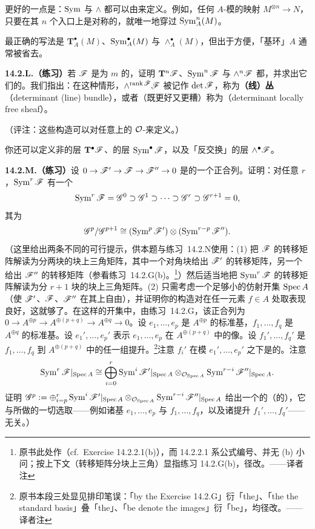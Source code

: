 更好的一点是：$\operatorname{Sym}$ 与 $\wedge$ 都可以由\trUniversalProperty{}来定义。例如，任何 $A$-模的映射 $M^{\otimes n}\to N$，只要在其 $n$ 个入口上是对称的，就唯一地穿过 $\operatorname{Sym}^n_A(M)$。

最正确的写法是 $\mathbf{T}^\bullet_A(M)$、$\operatorname{Sym}^\bullet_A(M)$ 与 $\wedge^\bullet_A(M)$，但出于方便，「基环」$A$ 通常被省去。

\textbf{14.2.L.（练习）}\quad 若 $\mathscr{F}$ 是\trRank{}为 $m$ 的\trLocallyFreeSheaf，证明 $\mathbf{T}^n\mathscr{F}$、$\operatorname{Sym}^n\mathscr{F}$ 与 $\wedge^n\mathscr{F}$ 都\trLocallyFree，并求出它们的\trRank。我们指出：在这种情形，$\wedge^{\operatorname{rank}\mathscr{F}}\mathscr{F}$ 被记作 $\det\mathscr{F}$，称为\textbf{\trDeterminant{}（线）丛}（determinant (line) bundle），或者（既更好又更糟）称为\textbf{\trDeterminant{}\trLocallyFreeSheaf}（determinant locally free sheaf）。

（评注：这些构造可以对任意\trRingedSpace{}上的 $\mathcal{O}$-\trModule{}来定义。）

你还可以定义非\trCommutative{}\trAlgebra{}的层 $\mathbf{T}^\bullet\mathscr{F}$、\trCommutative{}\trAlgebra{}的层 $\operatorname{Sym}^\bullet\mathscr{F}$，以及「反交换」\trAlgebra{}的层 $\wedge^\bullet\mathscr{F}$。

\textbf{14.2.M.（练习）}\quad 设 $0\to\mathscr{F}'\to\mathscr{F}\to\mathscr{F}''\to 0$ 是\trLocallyFreeSheaf{}的一个正合列。证明：对任意 $r$，$\operatorname{Sym}^r\mathscr{F}$ 有一个\trFiltration
\[
\operatorname{Sym}^r\mathscr{F}=\mathscr{G}^0\supset\mathscr{G}^1\supset\cdots\supset\mathscr{G}^r\supset\mathscr{G}^{r+1}=0,
\]
其\trSubquotient{}为
\[
\mathscr{G}^p/\mathscr{G}^{p+1}\cong(\operatorname{Sym}^p\mathscr{F}')\otimes(\operatorname{Sym}^{r-p}\mathscr{F}'').
\]
（这里给出两条不同的可行提示，供本题与\mbox{练习~14.2.N}使用：(1) 把 $\mathscr{F}$ 的转移矩阵解读为分两块的块上三角矩阵，其中一个对角块给出 $\mathscr{F}'$ 的转移矩阵，另一个给出 $\mathscr{F}''$ 的转移矩阵（参看\mbox{练习~14.2.G(b)}。\footnote{原书此处作（cf.\ Exercise 14.2.2.1(b)），而 14.2.2.1 系公式编号、并无 (b) 小问；按上下文（转移矩阵分块上三角）显指练习 14.2.G(b)，径改。——译者注}）然后适当地把 $\operatorname{Sym}^r\mathscr{F}$ 的转移矩阵解读为分 $r+1$ 块的块上三角矩阵。(2) 只需考虑一个足够小的仿射开集 $\operatorname{Spec} A$（使 $\mathscr{F}'$、$\mathscr{F}$、$\mathscr{F}''$ 在其上自由），并证明你的构造对在任一元素 $f\in A$ 处取\trLocalization{}表现良好，这就够了。在这样的开集中，由\mbox{练习~14.2.G}，该正合列为 $0\to A^{\oplus p}\to A^{\oplus(p+q)}\to A^{\oplus q}\to 0$。设 $e_1,\dots,e_p$ 是 $A^{\oplus p}$ 的标准基，$f_1,\dots,f_q$ 是 $A^{\oplus q}$ 的标准基。设 $e_1',\dots,e_p'$ 表示 $e_1,\dots,e_p$ 在 $A^{\oplus(p+q)}$ 中的像。设 $f_1',\dots,f_q'$ 是 $f_1,\dots,f_q$ 到 $A^{\oplus(p+q)}$ 中的任一组提升。\footnote{原书本段三处显见排印笔误：「by the Exercise 14.2.G」衍「the」、「the the standard basis」叠「the」、「be denote the images」衍「be」，均径改。——译者注}注意 $f_i'$ 在模 $e_1',\dots,e_p'$ 之下是\trWellDefined{}的。注意
\[
\operatorname{Sym}^r\mathscr{F}|_{\operatorname{Spec} A}\cong\bigoplus_{i=0}^{r}\operatorname{Sym}^i\mathscr{F}'|_{\operatorname{Spec} A}\otimes_{\mathcal{O}_{\operatorname{Spec} A}}\operatorname{Sym}^{r-i}\mathscr{F}''|_{\operatorname{Spec} A}.
\]
证明 $\mathscr{G}^p:=\oplus_{i=p}^{r}\operatorname{Sym}^i\mathscr{F}'|_{\operatorname{Spec} A}\otimes_{\mathcal{O}_{\operatorname{Spec} A}}\operatorname{Sym}^{r-i}\mathscr{F}''|_{\operatorname{Spec} A}$ 给出一个\trWellDefined{}的（\trLocallyFree{}的）\trSubsheaf，它与所做的一切选取——例如诸基 $e_1,\dots,e_p$ 与 $f_1,\dots,f_q$，以及诸提升 $f_1',\dots,f_q'$——无关。）

